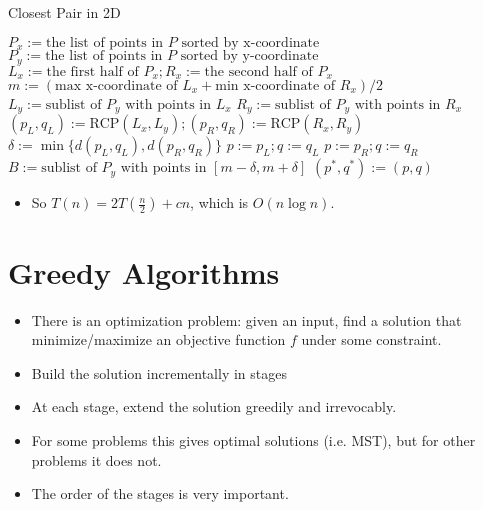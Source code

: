 \documentclass[a4paper,12pt]{article}
\begin{document}
\begin{algorithm}
\caption{Closest Pair in 2D}
\begin{algorithmic}[1]
\State $P_x:=\text{the list of points in }P\text{ sorted by x-coordinate}$
\State $P_y:=\text{the list of points in }P\text{ sorted by y-coordinate}$
\EndProcedure
{}
\EndIf
\State $L_x:=\text{the first half of }P_x;R_x:=\text{the second half of }P_x$
\State $m:=(\text{max x-coordinate of }L_x+\text{min x-coordinate of }R_x)/2$
\State $L_y:=\text{sublist of }P_y\text{ with points in }L_x$
\State $R_y:=\text{sublist of }P_y\text{ with points in }R_x$
\State $(p_L,q_L):=\text{RCP}(L_x,L_y);(p_R,q_R):=\text{RCP}(R_x,R_y)$
\State $\delta:=\min\{d(p_L,q_L),d(p_R,q_R)\}$
\State $p:=p_L;q:=q_L$
\Else
\State $p:=p_R;q:=q_R$
\EndIf
\State $B:=\text{sublist of }P_y\text{ with points in }[m-\delta,m+\delta]$
 $(p^*,q^*):=(p,q)$
\EndIf
\EndForeach
\EndForeach
\EndProcedure
\end{algorithmic}
\end{algorithm}
\begin{itemize}
    \item So $T(n)=2T(\frac{n}{2})+cn$, which is $O(n\log n)$.
\end{itemize}

\section{Greedy Algorithms}
\begin{itemize}
    \item There is an optimization problem: given an input, find a solution that minimize/maximize an objective function $f$ under some constraint.
    \item Build the solution incrementally in stages
    \item At each stage, extend the solution greedily and irrevocably.
    \item For some problems this gives optimal solutions (i.e. MST), but for other problems it does not.
    \item The order of the stages is very important.
\end{itemize}
\end{document}
